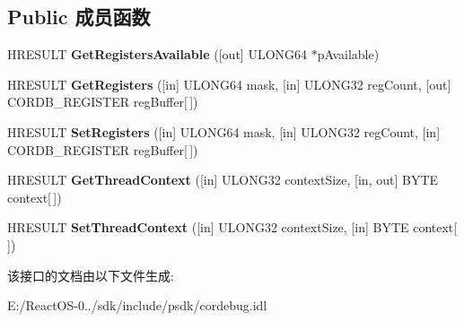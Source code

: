 \subsection*{Public 成员函数}
\begin{DoxyCompactItemize}
\item 
\mbox{\label{interface_i_cor_debug_register_set_aebea468e3a97a50da094249205dfc2f7}} 
H\+R\+E\+S\+U\+LT {\bfseries Get\+Registers\+Available} (\mbox{[}out\mbox{]} U\+L\+O\+N\+G64 $\ast$p\+Available)
\item 
\mbox{\label{interface_i_cor_debug_register_set_a2e24e5c70955048e4ff81b2078768173}} 
H\+R\+E\+S\+U\+LT {\bfseries Get\+Registers} (\mbox{[}in\mbox{]} U\+L\+O\+N\+G64 mask, \mbox{[}in\mbox{]} U\+L\+O\+N\+G32 reg\+Count, \mbox{[}out\mbox{]} C\+O\+R\+D\+B\+\_\+\+R\+E\+G\+I\+S\+T\+ER reg\+Buffer\mbox{[}$\,$\mbox{]})
\item 
\mbox{\label{interface_i_cor_debug_register_set_a6cb802ee44e1dadeabf05e3316b6a1ec}} 
H\+R\+E\+S\+U\+LT {\bfseries Set\+Registers} (\mbox{[}in\mbox{]} U\+L\+O\+N\+G64 mask, \mbox{[}in\mbox{]} U\+L\+O\+N\+G32 reg\+Count, \mbox{[}in\mbox{]} C\+O\+R\+D\+B\+\_\+\+R\+E\+G\+I\+S\+T\+ER reg\+Buffer\mbox{[}$\,$\mbox{]})
\item 
\mbox{\label{interface_i_cor_debug_register_set_a9d2415d5f3876d17dcc1c021d0596498}} 
H\+R\+E\+S\+U\+LT {\bfseries Get\+Thread\+Context} (\mbox{[}in\mbox{]} U\+L\+O\+N\+G32 context\+Size, \mbox{[}in, out\mbox{]} B\+Y\+TE context\mbox{[}$\,$\mbox{]})
\item 
\mbox{\label{interface_i_cor_debug_register_set_a1103d17c65d10cc196ba0ed11d4c4586}} 
H\+R\+E\+S\+U\+LT {\bfseries Set\+Thread\+Context} (\mbox{[}in\mbox{]} U\+L\+O\+N\+G32 context\+Size, \mbox{[}in\mbox{]} B\+Y\+TE context\mbox{[}$\,$\mbox{]})
\end{DoxyCompactItemize}


该接口的文档由以下文件生成\+:\begin{DoxyCompactItemize}
\item 
E\+:/\+React\+O\+S-\/0../sdk/include/psdk/cordebug.\+idl\end{DoxyCompactItemize}
